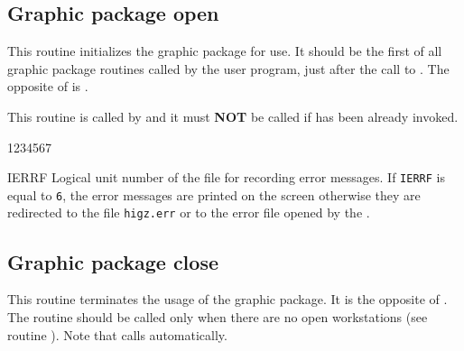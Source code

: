 \subsection{Graphic package open}
\Action
This routine initializes the graphic package for use. It should be the
first of all graphic package routines called by the user program, just after
the call to . The opposite of  is .
\par
This routine is called by  and it must {\bf NOT} be called if
 has been already invoked.
\Pdesc
\begin{DLtt}{1234567}
\item[IERRF] Logical unit number of the file for recording error messages.
             If {\tt IERRF} is equal to {\tt 6}, the error messages are printed
             on the screen otherwise they are redirected to the file
             {\tt higz.err} or to the error file opened by the \UGP.
\end{DLtt}
%
\subsection{Graphic package close}
\Action
This routine terminates the usage of the graphic package. It is the opposite
of . The routine  should be called only when there are
no open workstations (see routine ). Note that 
calls  automatically.
%
